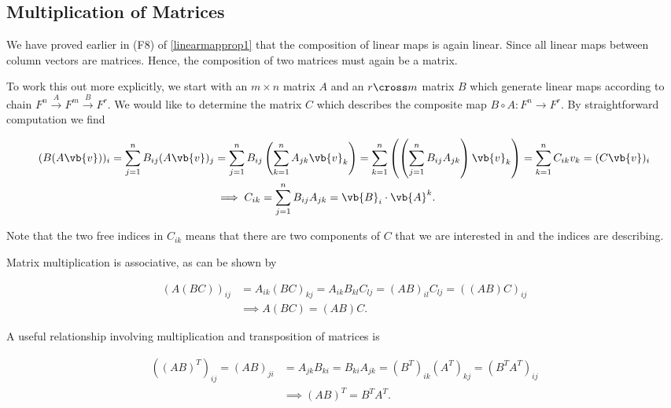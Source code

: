 \documentclass[a4paper,12pt]{report}
\begin{document}
\subsection{Multiplication of Matrices}

We have proved earlier in (F8) of \cref{linearmapprop1} that the composition of linear maps is again linear. Since all linear maps between column vectors are matrices. Hence, the composition of two matrices must again be a matrix. 

To work this out more explicitly, we start with an \(m \times n\) matrix \(A\) and an \(r \cross m\) matrix \(B\) which generate linear maps according to chain \(F^{n} \stackrel{A}{\rightarrow } F^{m} \stackrel{B}{\rightarrow } F^{r}   \). We would like to determine the matrix \(C\) which describes the composite map \(B \circ A: F^{n} \rightarrow F^{r}  \). By straightforward computation we find

\begin{equation}
    \begin{aligned}
    (B(A\vb{v} ))_{i} = \sum_{j=1}^{n} B_{ij} (A\vb{v} )_{j} &= \sum_{j=1}^{n} B_{ij} \left( \sum_{k=1}^{n} A_{jk}\vb{v} _{k}\right) = \sum_{k=1}^{n} \left( \left(\sum_{j=1}^{n} B_{ij} A_{jk}  \right) \vb{v} _{k} \right)= \sum_{k=1}^{n} C_{ik} v_{k} = (C\vb{v} )_{i} \\
    &\implies C_{ik} = \sum_{j=1}^{n} B_{ij} A_{jk} = \vb{B} _{i} \cdot \vb{A} ^{k}.   
    \end{aligned}
\end{equation}

Note that the two free indices in \(C_{ik} \) means that there are two components of \(C\) that we are interested in and the indices are describing. 

Matrix multiplication is associative, as can be shown by 

\begin{equation}
    \begin{aligned}
    (A(BC))_{ij} &= A_{ik}(BC)_{kj} = A_{ik}B_{kl}C_{lj} = (AB)_{il}C_{lj} = ((AB)C)_{ij} \\
    &\implies A(BC) = (AB)C.
    \end{aligned}
\end{equation}

A useful relationship involving multiplication and transposition of matrices is 

\begin{equation}
    \begin{aligned}
    ((AB)^{T} )_{ij} = (AB)_{ji} &= A _{jk}B_{ki} = B_{ki}A_{jk} = (B^{T} )_{ik} (A^{T} )_{kj} = (B^{T}A^{T}  )_{ij} \\
    &\implies (AB)^{T} = B^{T} A^{T}.   
    \end{aligned}     
\end{equation}
\end{document}
